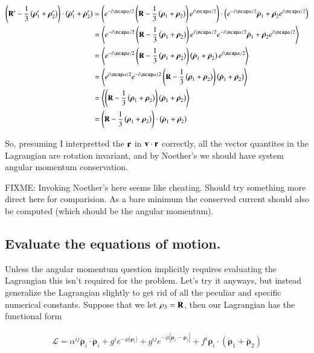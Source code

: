 \documentclass{article}
\newcommand{\Brho}[0]{\boldsymbol{\rho}}
\newcommand{\LL}[0]{\mathcal{L}}
\newcommand{\Abs}[1]{\left\lvert{#1}\right\rvert}
\newcommand{\gpgrade}[2] {{\left\langle{{#1}}\right\rangle}_{#2}}
\newcommand{\gpgradezero}[1] {\gpgrade{#1}{}}
\begin{document}
\begin{align*}
\left( \BR' - \inv{3}\left(\Brho_1' + \Brho_2'\right) \right) \cdot \left({\dot{\Brho}}_1' + {\dot{\Brho}}_2'\right) 
&= 
\left(e^{-i\ncap \alpha/2} \left( \BR - \inv{3}\left(\Brho_1 + \Brho_2\right) \right) e^{i\ncap\alpha/2}\right) \cdot
\left(e^{-i\ncap \alpha/2} \dot{\Brho}_1 + \dot{\Brho_2} e^{i\ncap\alpha/2}\right) \\
&= 
\gpgradezero{
e^{-i\ncap \alpha/2} \left( \BR - \inv{3}\left(\Brho_1 + \Brho_2\right) \right) e^{i\ncap\alpha/2}
e^{-i\ncap \alpha/2} \dot{\Brho}_1 + \dot{\Brho_2} e^{i\ncap\alpha/2}
} \\
&= 
\gpgradezero{
e^{-i\ncap \alpha/2} \left( \BR - \inv{3}\left(\Brho_1 + \Brho_2\right) \right) \left(\dot{\Brho}_1 + \dot{\Brho_2}\right) e^{i\ncap\alpha/2}
} \\
&= 
\gpgradezero{
e^{i\ncap\alpha/2}
e^{-i\ncap \alpha/2} \left( \BR - \inv{3}\left(\Brho_1 + \Brho_2\right) \right) \left(\dot{\Brho}_1 + \dot{\Brho_2}\right) 
} \\
&= 
\gpgradezero{
\left( \BR - \inv{3}\left(\Brho_1 + \Brho_2\right) \right) \left(\dot{\Brho}_1 + \dot{\Brho_2}\right) 
} \\
&= 
\left( \BR - \inv{3}\left(\Brho_1 + \Brho_2\right) \right) \cdot \left(\dot{\Brho}_1 + \dot{\Brho_2}\right) 
\end{align*}

So, presuming I interpretted the $\mathbf{r}$ in $\mathbf{v} \cdot \mathbf{r}$ correctly,
all the vector quantites in the Lagrangian are rotation invariant, and by Noether's we should have system angular momentum 
conservation.

FIXME: Invoking Noether's here seems like cheating.  Should try something more direct here for comparision.  As a bare minimum the conserved current should
also be computed (which should be the angular momentum).

\subsection{ Evaluate the equations of motion. }

Unless the angular momentum question implicitly requires evaluating the Lagrangian this isn't required for the problem.  Let's try it
anyways, but instead generalize the Lagrangian slightly to get rid of all the peculiar and specific numerical constants.  Suppose that we let
$\rho_3 = \mathbf{R}$, then our Lagrangian has the functional form

\begin{align*}
\LL = \alpha^{ij} \dot{\Brho}_i \cdot \dot{\Brho}_i 
+ g^i e^{-\mu \Abs{\Brho_i}}
+ g^{ij} e^{-\mu \Abs{ \Brho_i - \Brho_j }}
+ f^i \Brho_i \cdot ( \dot{\Brho}_1 + \dot{\Brho}_2 )
\end{align*}
\end{document}
